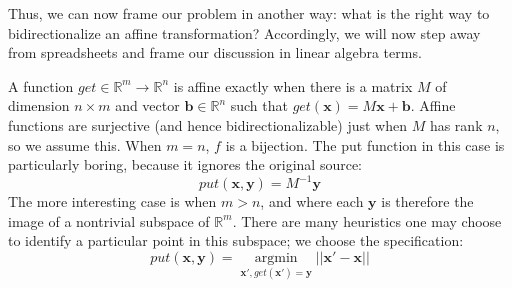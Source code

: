 \documentclass{article}
\newcommand{\R}{\mathbb R}
\begin{document}
Thus, we can now frame our problem in another way: what is the right way to
bidirectionalize an affine transformation? Accordingly, we will now step
away from spreadsheets and frame our discussion in linear algebra terms.

\newcommand{\argmin}[1]{\underset{#1}{\operatorname{argmin}}}
\newcommand{\lget}{\mathit{get}}
\newcommand{\lput}{\mathit{put}}
\newcommand{\x}{\mathbf x}
\newcommand{\y}{\mathbf y}
A function $\lget \in \R^m \to \R^n$ is affine exactly when there is a matrix
$M$ of dimension $n \times m$ and vector $\mathbf b \in \R^n$ such that $\lget(\x) =
M\x +\mathbf b$.  Affine functions are surjective (and hence bidirectionalizable)
just when $M$ has rank $n$, so we assume this. When $m=n$, $f$ is a
bijection. The put function in this case is particularly boring, because it
ignores the original source:
\[\lput(\x,\y) = M^{-1}\y\]
The more interesting case is when $m>n$, and where each $\y$ is therefore
the image of a nontrivial subspace of $\R^m$. There are many heuristics one
may choose to identify a particular point in this subspace; we choose the
specification:
\[\lput(\x,\y) = \argmin{\x',\lget(\x')=\y}||\x' - \x||\]
\end{document}
